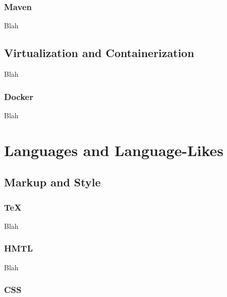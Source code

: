 
\subsubsection{Maven}

Blah


\subsection{Virtualization and Containerization}

Blah

\subsubsection{Docker}

Blah


\toclineskip
\section{Languages and Language-Likes}



\subsection{Markup and Style}

\subsubsection{TeX}

Blah

\subsubsection{HMTL}

Blah

\subsubsection{CSS}

